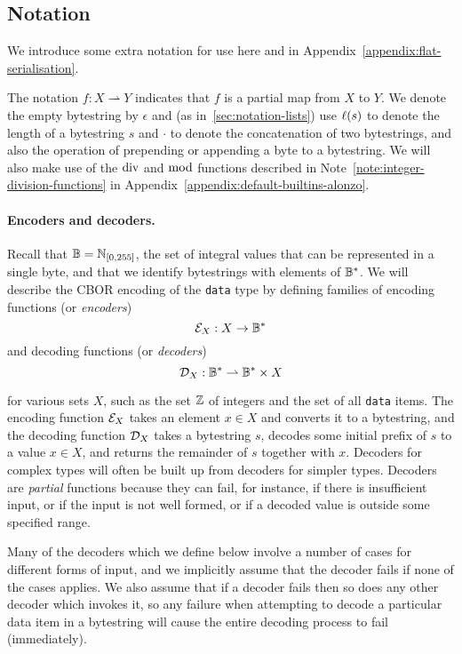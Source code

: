 \subsection{Notation}
We introduce some extra notation for use here and in
Appendix~\ref{appendix:flat-serialisation}.

\medskip 
\noindent The notation $f: X \rightharpoonup Y$ indicates that $f$ is a partial
map from $X$ to $Y$.  We denote the empty bytestring by $\epsilon$ and (as
in~\ref{sec:notation-lists}) use $\operatorname{\ell}(s)$ to denote the length of a
bytestring $s$ and $\cdot$ to denote the concatenation of two bytestrings, and
also the operation of prepending or appending a byte to a bytestring. We will
also make use of the $\operatorname{div}$ and $\operatorname{mod}$ functions described in
Note~\ref{note:integer-division-functions} in
Appendix~\ref{appendix:default-builtins-alonzo}.%

\paragraph{Encoders and decoders.}
Recall that $\mathbb{B} = \mathbb{N}_{[0,255]}$, the set of integral values that can
be represented in a single byte, and that we identify bytestrings with elements
of $\mathbb{B}^*$. We will describe the CBOR encoding of the \texttt{data} type by
defining families of encoding functions (or \textit{encoders})
$$
\mathcal{E}_X : X \rightarrow \mathbb{B}^*
$$%
and decoding functions (or \textit{decoders})
$$
\mathcal{D}_X : \mathbb{B}^* \rightharpoonup \mathbb{B}^* \times X
$$%

\noindent for various sets $X$, such as the set $\mathbb{Z}$ of integers and the set of
all \texttt{data} items.  The encoding function $\mathcal{E}_X$ takes an element $x \in
X$ and converts it to a bytestring, and the decoding function $\mathcal{D}_X$ takes a
bytestring $s$, decodes some initial prefix of $s$ to a value $x \in X$, and
returns the remainder of $s$ together with $x$.  Decoders for complex types will
often be built up from decoders for simpler types.  Decoders are
\textit{partial} functions because they can fail, for instance, if there is
insufficient input, or if the input is not well formed, or if a decoded value is
outside some specified range. 

Many of the decoders which we define below involve a number of cases for
different forms of input, and we implicitly assume that the decoder fails if
none of the cases applies.  We also assume that if a decoder fails then so does
any other decoder which invokes it, so any failure when attempting to decode a
particular data item in a bytestring will cause the entire decoding process to
fail (immediately).

